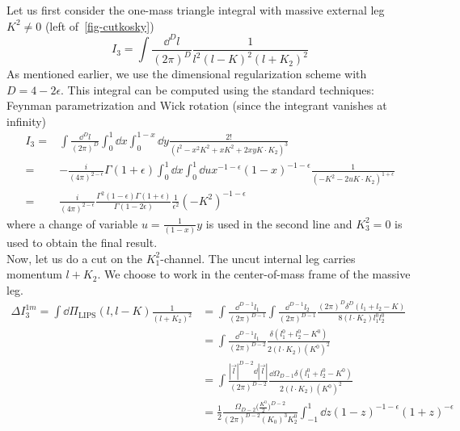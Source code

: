 Let us first consider the one-mass triangle integral with massive external leg $K^2 \neq 0$ (left of~\ref{fig-cutkosky})
\begin{equation*}
I_3 = \int\frac{\dd^D l }{(2\pi)^D}\frac{1}{l^2(l-K)^2(l+K_2)^2}
\end{equation*}
As mentioned earlier, we use the dimensional regularization scheme with $D = 4-2\epsilon$.
This integral can be computed using the standard techniques: Feynman parametrization and Wick rotation (since the integrant vanishes at infinity)
\begin{equation*}
\begin{split}
I_3 = & \int\frac{\dd^D l }{(2\pi)^D}\int_0^{1} \dd x \int_0^{1-x}\dd y \frac{2!}{(l^2 - x^2 K^2 + xK^2 + 2xy K\cdot K_2)^3}
\\
= &
-\frac{i}{(4\pi)^{2-\epsilon}}\Gamma (1+\epsilon)
\int^1_0 \dd x\int_0^1 \dd u x^{-1-\epsilon} (1-x)^{-1-\epsilon}
\frac{1}{(-K^2 - 2uK\cdot K_2)^{1+\epsilon}}
\\
= &
\frac{i}{(4\pi)^{2-\epsilon}}\frac{\Gamma^2(1-\epsilon)\Gamma(1+\epsilon)}{\Gamma(1-2\epsilon)}
\frac{1}{\epsilon^2}(-K^2)^{-1-\epsilon}
\end{split}
\end{equation*}
where a change of variable $u =\frac{1}{(1-x)}y$ is used in the second line and $K_3^2 = 0$ is used to obtain the final result.
\\
Now, let us do a cut on the $K_1^2$-channel. 
The uncut internal leg carries momentum $l + K_2$. 
We choose to work in the center-of-mass frame of the massive leg.
%
\begin{equation*}
\begin{split}
\Delta I_3^{1m} = \int\dd \Pi_{\textrm{LIPS}}(l, l-K) \frac{1}{(l+K_2)^2} & =
\int\frac{\dd^{D-1}l_1}{(2\pi)^{D-1}}\int\frac{\dd^{D-1}l_2}{(2\pi)^{D-1}}
\frac{(2\pi)^{D}\delta^{D}(l_1 + l_2 - K)}{8(l\cdot K_2)l_1^0 l_2^0}
\\
& = \int\frac{\dd^{D-1}l_1}{(2\pi)^{D-2}}\frac{\delta(l_1^0 + l_2^0 - K^0)}{2(l\cdot K_2)(K^0)^2} 
\\
& = \int\frac{|\vec{l}|^{D-2}\dd |\vec{l}|}{(2\pi)^{D-2}} \frac{\dd\Omega_{D-1}\delta(l_1^0 + l_2^0 - K^0)}{2 ( l \cdot K_2)(K^0)^2}
\\
& = \frac{1}{2}\frac{\Omega_{D-2}\big(\frac{K^0}{2}\big)^{D-2}}{(2\pi)^{D-2}(K_0)^3 K^0_2} \int_{-1}^1\dd z (1-z)^{-1-\epsilon}(1+z)^{-\epsilon}
\end{split} 
\end{equation*}
